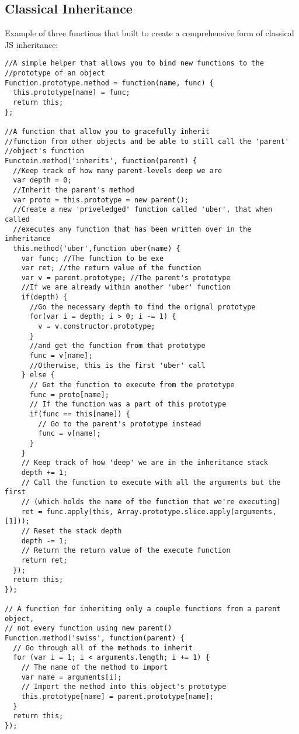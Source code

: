\documentclass[a4paper,11pt]{book}
\begin{document}
\subsection{Classical Inheritance}
Example of three functions that built to create a comprehensive form of
classical JS inheritance:
\begin{verbatim}
//A simple helper that allows you to bind new functions to the 
//prototype of an object
Function.prototype.method = function(name, func) {
  this.prototype[name] = func;
  return this;
};

//A function that allow you to gracefully inherit
//function from other objects and be able to still call the 'parent'
//object's function
Functoin.method('inherits', function(parent) {
  //Keep track of how many parent-levels deep we are
  var depth = 0;
  //Inherit the parent's method
  var proto = this.prototype = new parent();
  //Create a new 'priveledged' function called 'uber', that when called
  //executes any function that has been written over in the inheritance
  this.method('uber',function uber(name) {
    var func; //The function to be exe
    var ret; //the return value of the function
    var v = parent.prototype; //The parent's prototype
    //If we are already within another 'uber' function
    if(depth) {
      //Go the necessary depth to find the orignal prototype
      for(var i = depth; i > 0; i -= 1) {
        v = v.constructor.prototype;
      }
      //and get the function from that prototype
      func = v[name];
      //Otherwise, this is the first 'uber' call
    } else {
      // Get the function to execute from the prototype
      func = proto[name];
      // If the function was a part of this prototype
      if(func == this[name]) {
        // Go to the parent's prototype instead
        func = v[name];
      }
    }
    // Keep track of how 'deep' we are in the inheritance stack
    depth += 1;
    // Call the function to execute with all the arguments but the first
    // (which holds the name of the function that we're executing)
    ret = func.apply(this, Array.prototype.slice.apply(arguments, [1]));
    // Reset the stack depth
    depth -= 1;
    // Return the return value of the execute function
    return ret;
  });
  return this;
});

// A function for inheriting only a couple functions from a parent object,
// not every function using new parent()
Function.method('swiss', function(parent) {
  // Go through all of the methods to inherit
  for (var i = 1; i < arguments.length; i += 1) {
    // The name of the method to import
    var name = arguments[i];
    // Import the method into this object's prototype
    this.prototype[name] = parent.prototype[name];
  }
  return this;
});
\end{verbatim}
\end{document}
